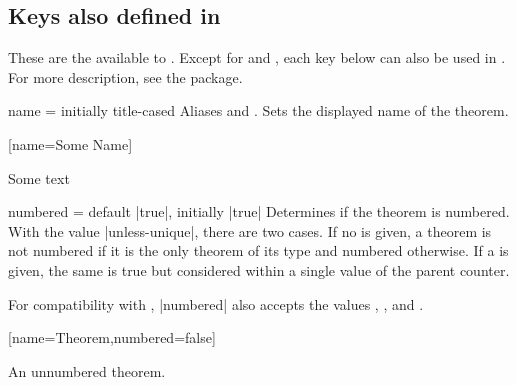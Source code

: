 \documentclass{ltxdoc}
\begin{document}
\subsection{Keys also defined in } \label{thm-thmtools-keys}

These are the  available to .
Except for  and , each key below can also be used in .
For more description, see the \href{https://ctan.org/pkg/thmtools}{} package.

\begin{docKey}[][doc label=thm/name]{name}
  {=}
  {initially title-cased }
Aliases  and .
Sets the displayed name of the theorem.

\begin{codepreamble}
[name=Some Name]
\end{codepreamble}

\begin{keythmscode}[withpreamble]
\begin{mythm}
Some text
\end{mythm}
\end{keythmscode}

\end{docKey}

\begin{docKey}{numbered}
  {=\textbar{}\textbar {}}
  {default |true|, initially |true|}
Determines if the theorem is numbered.
With the value |unless-unique|, there are two cases.
If no  is given, a theorem is not numbered if it is the only theorem of its type and numbered otherwise.
If a  is given, the same is true but considered within a single value of the parent counter.

For compatibility with , |numbered| also accepts the values , , and .

\begin{codepreamble}
[name=Theorem,numbered=false]
\end{codepreamble}

\begin{keythmscode}[withpreamble]
\begin{theorem*}
An unnumbered theorem.
\end{theorem*}
\end{keythmscode}

\end{docKey}
\end{document}
